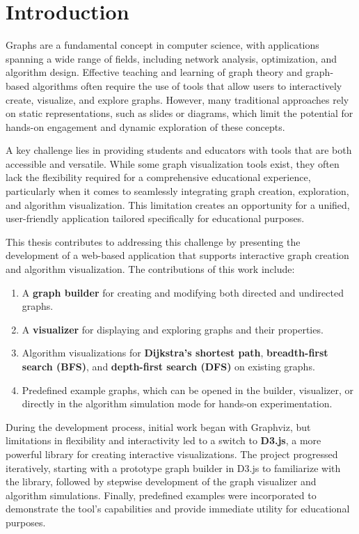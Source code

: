\section{Introduction}
\label{sec:introduction}
Graphs are a fundamental concept in computer science, with applications spanning a wide range of fields, including network analysis, optimization, and algorithm design. Effective teaching and learning of graph theory and graph-based algorithms often require the use of tools that allow users to interactively create, visualize, and explore graphs. However, many traditional approaches rely on static representations, such as slides or diagrams, which limit the potential for hands-on engagement and dynamic exploration of these concepts.

A key challenge lies in providing students and educators with tools that are both accessible and versatile. While some graph visualization tools exist, they often lack the flexibility required for a comprehensive educational experience, particularly when it comes to seamlessly integrating graph creation, exploration, and algorithm visualization. This limitation creates an opportunity for a unified, user-friendly application tailored specifically for educational purposes.

This thesis contributes to addressing this challenge by presenting the development of a web-based application that supports interactive graph creation and algorithm visualization. The contributions of this work include:
\begin{enumerate}
    \item A \textbf{graph builder} for creating and modifying both directed and undirected graphs.
    \item A \textbf{visualizer} for displaying and exploring graphs and their properties.
    \item Algorithm visualizations for \textbf{Dijkstra’s shortest path}, \textbf{breadth-first search (BFS)}, and \textbf{depth-first search (DFS)} on existing graphs.
    \item Predefined example graphs, which can be opened in the builder, visualizer, or directly in the algorithm simulation mode for hands-on experimentation.
\end{enumerate}

During the development process, initial work began with Graphviz, but limitations in flexibility and interactivity led to a switch to \textbf{D3.js}, a more powerful library for creating interactive visualizations. The project progressed iteratively, starting with a prototype graph builder in D3.js to familiarize with the library, followed by stepwise development of the graph visualizer and algorithm simulations. Finally, predefined examples were incorporated to demonstrate the tool's capabilities and provide immediate utility for educational purposes.

